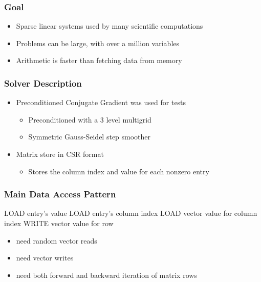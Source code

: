 \documentclass{beamer}
\title{}
\author{Neil Lindquist}
\date{April 16th, 2019}
\begin{document}
\begin{frame}
	\titlepage
\end{frame}

\begin{frame}
	\frametitle{Goal}
	\begin{itemize}
		\item Sparse linear systems used by many scientific computations
		\item Problems can be large, with over a million variables
		\item Arithmetic is faster than fetching data from memory
	\end{itemize}
\end{frame}

\begin{frame}[fragile]
	\frametitle{Solver Description}
	\begin{itemize}
		\item Preconditioned Conjugate Gradient was used for tests
		\begin{itemize}
			\item Preconditioned with a 3 level multigrid
			\item Symmetric Gauss-Seidel step smoother
		\end{itemize}
		\item Matrix store in CSR format
		\begin{itemize}
			\item Stores the column index and value for each nonzero entry
		\end{itemize}
	\end{itemize}
\end{frame}


\begin{frame}
	\frametitle{Main Data Access Pattern}
	\begin{algorithmic}
				\STATE LOAD entry's value
				\STATE LOAD entry's column index
				\STATE LOAD vector value for column index
			\ENDFOR
			\STATE WRITE vector value for row
		\ENDFOR
	\end{algorithmic}
	
	\begin{itemize}
		\item need random vector reads
		\item need vector writes
		\item need both forward and backward iteration of matrix rows
	\end{itemize}
\end{frame}
\end{document}
